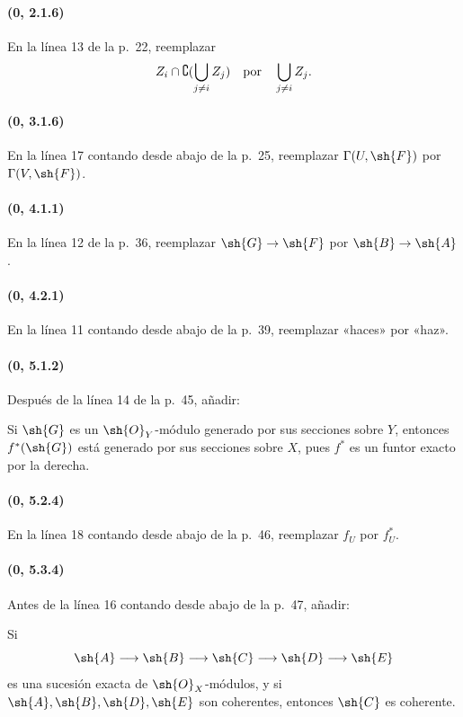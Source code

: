 \documentclass[oneside,10pt]{amsart}
\makeatletter
\newcommand{\ega@arrow}[2]{\mathchoice{#1}{#2}{#2}{#2}}
\renewcommand{\to}{\ega@arrow{\longrightarrow}{\rightarrow}}
\makeatother
\begin{document}
\paragraph{(0, 2.1.6)}
En la línea 13 de la p.~22, reemplazar
\[
  Z_i\cap\complement(\bigcup\limits_{j\ne i}Z_j)
  \quad\hbox{por}\quad
  \bigcup_{j\ne i}Z_j.
\]

\paragraph{(0, 3.1.6)}
En la línea 17 contando desde abajo de la p.~25, reemplazar
$\Gamma(U,\sh{F})$ por $\Gamma(V,\sh{F})$.

\paragraph{(0, 4.1.1)}
En la línea 12 de la p.~36, reemplazar $\sh{G}\to\sh{F}$ por
$\sh{B}\to\sh{A}$.

\paragraph{(0, 4.2.1)}
En la línea 11 contando desde abajo de la p.~39, reemplazar «haces» por
«haz».

\paragraph{(0, 5.1.2)}
Después de la línea 14 de la p.~45, añadir:

Si $\sh{G}$ es un $\sh{O}_Y$-módulo generado por sus secciones sobre
$Y$, entonces $f^*(\sh{G})$ está generado por sus secciones sobre $X$,
pues $f^*$ es un funtor exacto por la derecha.

\paragraph{(0, 5.2.4)}
En la línea 18 contando desde abajo de la p.~46, reemplazar $f_U$ por
$f_U^*$.

\paragraph{(0, 5.3.4)}
Antes de la línea 16 contando desde abajo de la p.~47, añadir:

Si
\[
  \sh{A}\to\sh{B}\to\sh{C}\to\sh{D}\to\sh{E}
\]
es una sucesión exacta de $\sh{O}_X$-módulos, y si
$\sh{A},\sh{B},\sh{D},\sh{E}$ son coherentes, entonces $\sh{C}$ es
coherente.
\end{document}
